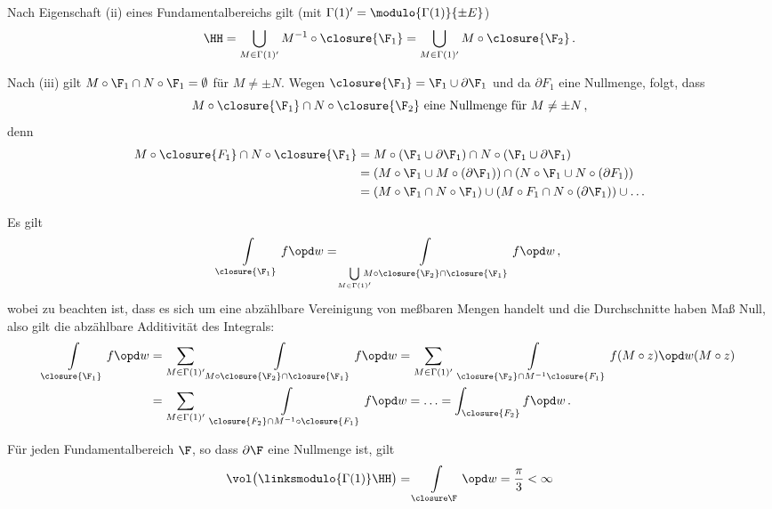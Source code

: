 \begin{bewe}
	Nach Eigenschaft (ii) eines Fundamentalbereichs gilt (mit $\Gamma(1)' = \modulo{\Gamma(1)}{\pm E}$)
	\[
		\HH = \bigcup_{M \in \Gamma(1)'} M^{-1} \circ \closure{\F_1} = \bigcup_{M \in \Gamma(1)'} M \circ \closure{\F_2}
		\,.
	\]
	
	Nach (iii) gilt $M \circ \F_1 \cap N \circ \F_1 = \emptyset$ für $M \not= \pm N$.
	Wegen $\closure{\F_1} = \F_1 \cup \partial\F_1$ und da $\partial F_1$ eine Nullmenge, folgt, dass
	\[
		M \circ \closure{\F_1} \cap N\circ\closure{\F_2} \text{ eine Nullmenge für } M\not=\pm N
		\,,
	\]
	denn
	\begin{align*}
		M \circ \closure{F_1} \cap N \circ \closure{\F_1}
		&= M \circ (\F_1 \cup \partial \F_1) \cap N \circ (\F_1 \cup \partial \F_1) \\
		&= (M \circ \F_1 \cup M \circ (\partial \F_1)) \cap (N \circ \F_1 \cup N \circ (\partial F_1)) \\
		&= (M \circ \F_1 \cap N \circ \F_1) \cup (M \circ F_1 \cap N \circ (\partial \F_1)) \cup \ldots
	\end{align*}
	
	Es gilt
	\[
		\int\limits_{\closure{\F_1}} f \opd w
		= \int\limits_{\bigcup\limits_{M \in \Gamma(1)'} \!\!\!\!\!\! M \circ \closure{\F_2} \cap \closure{\F_1}} f \opd w
		\,,
	\]
	wobei zu beachten ist, dass es sich um eine abzählbare Vereinigung von meßbaren Mengen handelt und die Durchschnitte haben Maß Null, also gilt die abzählbare Additivität des Integrals:
	\begin{align*}
		\int\limits_{\closure{\F_1}} f \opd w
		&= \sum_{M \in \Gamma(1)'} \int\limits_{M\circ \closure{\F_2} \cap \closure{\F_1}} f \opd w
		= \sum_{M \in \Gamma(1)'} \ \int\limits_{\closure{\F_2} \cap M^{-1}\closure{F_1}} f(M \circ z) \opd w(M \circ z) \\
		&= \sum_{M \in \Gamma(1)'}\ \int\limits_{\closure{F_2} \cap M^{-1} \circ \closure{F_1}} f \opd w
		= \ldots = \int_{\closure{F_2}} f\opd w
		\,.
	\end{align*}
\end{bewe}

\begin{bsp}
	Für jeden Fundamentalbereich $\F$, so dass $\partial \F$ eine Nullmenge ist, gilt
	\[
		\vol\bigl(\linksmodulo{\Gamma(1)}\HH\bigr) = \int\limits_{\closure \F} \opd w = \frac{\pi}{3} < \infty
	\]
\end{bsp}

